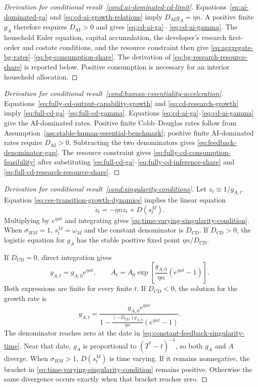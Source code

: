\begin{proof}[Derivation for conditional result~\ref{cond:ai-dominated-cd-limit}]
Equations~\eqref{eq:ai-dominated-ga} and
\eqref{eq:cd-ai-growth-relations} imply
$D_{\mathrm{AI}}g_A=\eta n$. A positive finite $g_A$ therefore requires
$D_{\mathrm{AI}}>0$ and gives \eqref{eq:cd-ai-ga}--
\eqref{eq:cd-ai-gamma}. The household Euler equation, capital accumulation, the
developer's research first-order and costate conditions, and the resource constraint
then give \eqref{eq:aggregate-bg-rates}--\eqref{eq:bg-consumption-share}. The
derivation of \eqref{eq:bg-research-resource-share} is reported below. Positive
consumption is necessary for an interior household allocation.
\end{proof}

\begin{proof}[Derivation for conditional result~\ref{cond:human-essentiality-acceleration}]
Equations~\eqref{eq:fully-cd-output-capability-growth} and
\eqref{eq:cd-research-growth} imply
\eqref{eq:full-cd-ga}--\eqref{eq:full-cd-gamma}. Equations
\eqref{eq:cd-ai-ga}--\eqref{eq:cd-ai-gamma} give the AI-dominated rates. Positive
finite Cobb--Douglas rates follow from
Assumption~\ref{ass:stable-human-essential-benchmark}; positive finite
AI-dominated rates require $D_{\mathrm{AI}}>0$. Subtracting the two denominators gives
\eqref{eq:feedback-denominator-gap}. The resource constraint
gives \eqref{eq:fully-cd-consumption-feasibility} after substituting
\eqref{eq:full-cd-ga}--\eqref{eq:fully-cd-inference-share} and
\eqref{eq:full-cd-research-resource-share}.
\end{proof}

\begin{proof}[Derivation for conditional result~\ref{cond:singularity-conditions}]
Let $z_t\equiv1/g_{A,t}$. Equation
\eqref{eq:ces-transition-growth-dynamics} implies the linear equation
\[
    \dot z_t=-\eta n z_t+D(s^M_t).
\]
Multiplying by $e^{\eta nt}$ and integrating gives
\eqref{eq:time-varying-singularity-condition}. When
$\sigma_{HM}=1$, $s^M_t=\omega_M$ and the constant denominator is
$D_{\mathrm{CD}}$. If $D_{\mathrm{CD}}>0$, the logistic equation for $g_A$ has
the stable positive fixed point $\eta n/D_{\mathrm{CD}}$.

If $D_{\mathrm{CD}}=0$, direct integration gives
\[
    g_{A,t}=g_{A,0}e^{\eta nt},
    \qquad
    A_t
    =
    A_0\exp\left[
        \frac{g_{A,0}}{\eta n}
        \left(e^{\eta nt}-1\right)
    \right].
\]
Both expressions are finite for every finite $t$. If $D_{\mathrm{CD}}<0$, the
solution for the growth rate is
\[
    g_{A,t}
    =
    \frac{g_{A,0}e^{\eta nt}}
    {1-\frac{(-D_{\mathrm{CD}})g_{A,0}}{\eta n}
        \left(e^{\eta nt}-1\right)}.
\]
The denominator reaches zero at the date in
\eqref{eq:constant-feedback-singularity-time}. Near that date, $g_A$ is
proportional to $(T^*-t)^{-1}$, so both $g_A$ and $A$ diverge. When
$\sigma_{HM}>1$, $D(s^M_t)$ is time varying. If it remains nonnegative, the bracket
in \eqref{eq:time-varying-singularity-condition} remains positive. Otherwise the
same divergence occurs exactly when that bracket reaches zero.
\end{proof}

